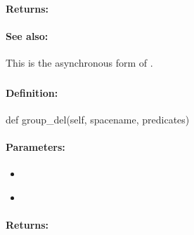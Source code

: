 \paragraph{Returns:}


\paragraph{See also:}  This is the asynchronous form of .

\pagebreak
\subsubsection{}
\label{api:python:group_del}


\paragraph{Definition:}
\begin{pythoncode}
def group_del(self, spacename, predicates)
\end{pythoncode}

\paragraph{Parameters:}
\begin{itemize}[noitemsep]
\item {}\\

\item {}\\

\end{itemize}

\paragraph{Returns:}


\pagebreak
\subsubsection{}
\label{api:python:async_group_del}


